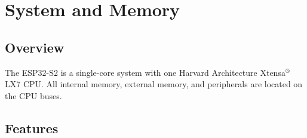 \documentclass[main\_\_EN.tex]{subfiles}
\begin{document}
\setenglishformatting

\ifglobal
\else
    \listoftodos
    {\let\clearpage\relax \listofdonetodos}
    \tableofcontents
\fi




\hypertarget{sysmem}{}
\chapter{System and Memory}
\label{mod:sysmem}


\section{Overview}

The ESP32-S2 is a single-core system with one Harvard Architecture Xtensa$^®$ LX7 CPU. All internal memory, external memory, and peripherals are located on the CPU buses.

\section{Features}
\end{document}
